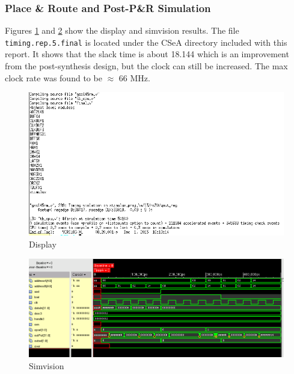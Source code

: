 \documentclass[12pt]{article}
\begin{document}
\subsubsection{Place \& Route and Post-P\&R Simulation}
Figures \ref{fig:EC-text-CSeA} and \ref{fig:EC-test-CSeA} show the display and simvision results. The file \texttt{timing.rep.5.final} is located under the CSeA directory included with this report. It shows that the slack time is about 18.144 which is an improvement from the post-synthesis design, but the clock can still be increased. The max clock rate was found to be $\approx$ 66 MHz.
\begin{figure}[H]
\centering
\includegraphics[width=.7\linewidth]{../CSeA/encounter-text}
\caption{Display}
\label{fig:EC-text-CSeA}
\end{figure}
\begin{figure}[H]
\centering
\includegraphics[width=\linewidth]{../CSeA/encounter-test}
\caption{Simvision}
\label{fig:EC-test-CSeA}
\end{figure}
\end{document}
